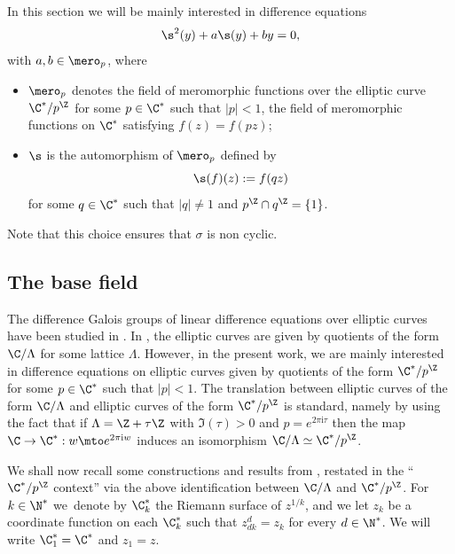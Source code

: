 In this section we will be mainly interested in difference equations
\begin{equation}\label{eq:2hypergeo}
\s^{2}(y)+a\s (y)+by=0,
\end{equation}
with $a,b\in \mero_{p}$, where
\begin{itemize}
\item $\mero_{p}$ denotes the field of meromorphic functions over the elliptic curve $\C^{*}/p^{\Z}$ for some $p\in \C^{*}$ such that $\vert p \vert < 1$, \ie the field of meromorphic functions on $\C^{*}$ satisfying $f(z)=f(pz)$;
\item $\s$ is the automorphism of $\mero_{p}$ defined by
\[
\s (f)(z):=f(qz)
\]
for some $q\in \C^{*}$ such that $\vert q \vert \neq 1$ and $p^{\Z} \cap q^{\Z}=\{1\}$.
\end{itemize}
Note that this choice ensures that $\sigma$ is non cyclic.

\subsection{The base field}\label{sec31}

The difference Galois groups of linear difference equations over elliptic curves have been studied in \cite{dreyfus2015galois}. In \loccit, the elliptic curves are given by quotients of the form $\C/\Lambda$ for some lattice $\Lambda$.
However, in the present work, we are mainly interested in difference equations on elliptic curves given by quotients of the form $\C^{*}/p^{\Z}$ for some $p\in \C^{*}$ such that $\vert p \vert < 1$. The translation between elliptic curves of the form $\C/\Lambda$ and elliptic curves of the form $\C^{*}/p^{\Z}$ is standard, namely by using the fact that if $\Lambda=\Z+\tau \Z$ with $\Im(\tau)>0$ and $p = e^{2 \pi \mathrm{i} \tau}$ then the map $\C\to\C^{*}:w\mto e^{2\pi\mathrm{i}w}$ induces an isomorphism $\C/\Lambda\simeq \C^{*}/p^\Z$.

We shall now recall some constructions and results from \cite{dreyfus2015galois}, restated in the ``$\C^{*}/p ^{\Z}$ context'' via the above identification between $\C/\Lambda$ and $\C^{*}/p ^{\Z}$. For $k\in\N^{*}$ we~denote by $\C^{*}_k$ the Riemann surface of $z^{1/k}$, and we let $z_k$ be a coordinate function on each $\C^{*}_k$ such that $z_{dk}^d=z_k$ for every $d\in\N^{*}$. We will write $\C^{*}_1=\C^{*}$ and $z_1=z$.

